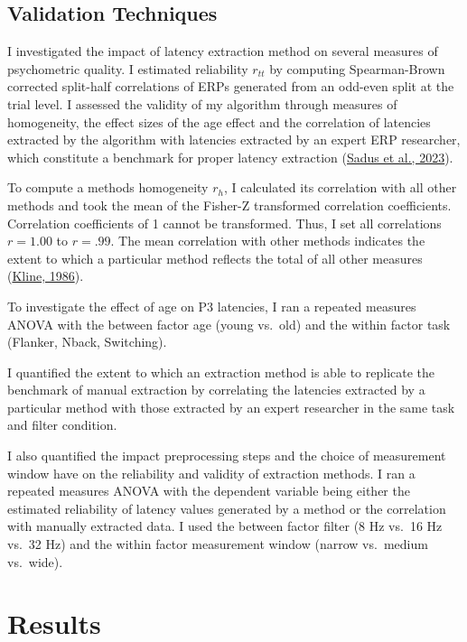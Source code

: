 \documentclass[
  man]{apa7}
\begin{document}
\hypertarget{validation-techniques}{%
\subsection{Validation Techniques}\label{validation-techniques}}

I investigated the impact of latency extraction method on several measures of psychometric quality. I estimated reliability \(r_{tt}\) by computing Spearman-Brown corrected split-half correlations of ERPs generated from an odd-even split at the trial level. I assessed the validity of my algorithm through measures of homogeneity, the effect sizes of the age effect and the correlation of latencies extracted by the algorithm with latencies extracted by an expert ERP researcher, which constitute a benchmark for proper latency extraction (\protect\hyperlink{ref-sadus2023multiverse}{Sadus et al., 2023}).

To compute a methods homogeneity \(r_h\), I calculated its correlation with all other methods and took the mean of the Fisher-Z transformed correlation coefficients. Correlation coefficients of 1 cannot be transformed. Thus, I set all correlations \(r = 1.00\) to \(r = .99\). The mean correlation with other methods indicates the extent to which a particular method reflects the total of all other measures (\protect\hyperlink{ref-kline1986handbook}{Kline, 1986}).

To investigate the effect of age on P3 latencies, I ran a repeated measures ANOVA with the between factor age (young vs.~old) and the within factor task (Flanker, Nback, Switching).

I quantified the extent to which an extraction method is able to replicate the benchmark of manual extraction by correlating the latencies extracted by a particular method with those extracted by an expert researcher in the same task and filter condition.

I also quantified the impact preprocessing steps and the choice of measurement window have on the reliability and validity of extraction methods. I ran a repeated measures ANOVA with the dependent variable being either the estimated reliability of latency values generated by a method or the correlation with manually extracted data. I used the between factor filter (8 Hz vs.~16 Hz vs.~32 Hz) and the within factor measurement window (narrow vs.~medium vs.~wide).

\hypertarget{results}{%
\section{Results}\label{results}}
\end{document}
